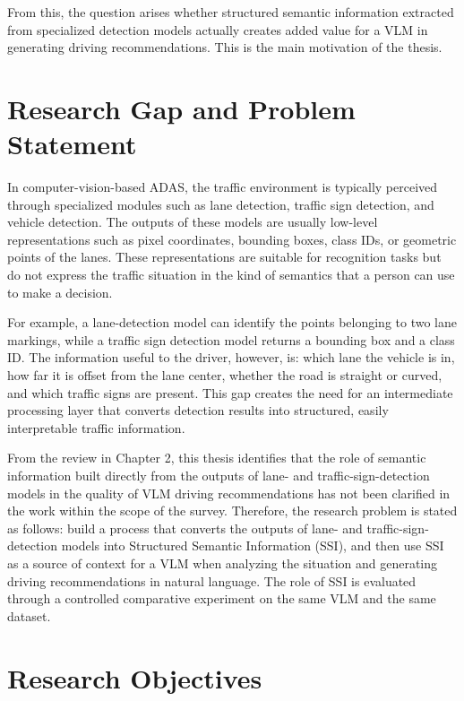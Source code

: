 \documentclass[12pt,a4paper]{report}
\begin{document}
From this, the question arises whether structured semantic information extracted from specialized detection models actually creates added value for a VLM in generating driving recommendations. This is the main motivation of the thesis.

\section{Research Gap and Problem Statement}

In computer-vision-based ADAS, the traffic environment is typically perceived through specialized modules such as lane detection, traffic sign detection, and vehicle detection. The outputs of these models are usually low-level representations such as pixel coordinates, bounding boxes, class IDs, or geometric points of the lanes. These representations are suitable for recognition tasks but do not express the traffic situation in the kind of semantics that a person can use to make a decision.

For example, a lane-detection model can identify the points belonging to two lane markings, while a traffic sign detection model returns a bounding box and a class ID. The information useful to the driver, however, is: which lane the vehicle is in, how far it is offset from the lane center, whether the road is straight or curved, and which traffic signs are present. This gap creates the need for an intermediate processing layer that converts detection results into structured, easily interpretable traffic information.

From the review in Chapter 2, this thesis identifies that the role of semantic information built directly from the outputs of lane- and traffic-sign-detection models in the quality of VLM driving recommendations has not been clarified in the work within the scope of the survey. Therefore, the research problem is stated as follows: build a process that converts the outputs of lane- and traffic-sign-detection models into Structured Semantic Information (SSI), and then use SSI as a source of context for a VLM when analyzing the situation and generating driving recommendations in natural language. The role of SSI is evaluated through a controlled comparative experiment on the same VLM and the same dataset.

\section{Research Objectives}
\end{document}
